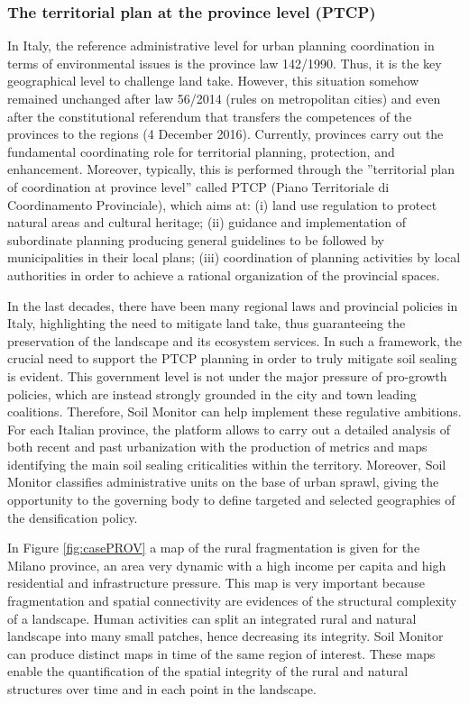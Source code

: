 \documentclass[APA,LATO1COL,doublespace]{WileyNJD-v2}
\begin{document}
\subsubsection{The territorial plan at the province level (PTCP)}
\label{sec:casePROV}
In Italy, the reference administrative level for urban planning coordination in terms of environmental issues is the province law 142/1990. 
Thus, it is the key geographical level to challenge land take. 
However, this situation somehow remained unchanged after law 56/2014 (rules on metropolitan cities) and even after the constitutional referendum that transfers the competences of the provinces to the regions (4 December 2016).
Currently, provinces %
carry out the fundamental coordinating role for territorial planning, protection, and enhancement. 
Moreover, typically, this is performed through the ''territorial plan of coordination at province level'' called PTCP (Piano Territoriale di Coordinamento Provinciale), which aims at: (i) land use regulation to protect natural areas and cultural heritage; (ii) guidance and implementation of subordinate planning producing general guidelines to be followed by municipalities in their local plans; (iii) coordination of planning activities by local authorities in order to achieve a rational organization of the provincial spaces.

In the last decades, there have been many regional laws and provincial policies in Italy, highlighting the need to mitigate land take, thus guaranteeing the preservation of the landscape and its ecosystem services. 
In such a framework, the crucial need to support the PTCP planning in order to truly mitigate soil sealing is evident. 
This government level is not under the major pressure of pro-growth policies, which are instead strongly grounded in the city and town leading coalitions.
Therefore, Soil Monitor can help implement these regulative ambitions.
For each Italian province, the platform allows to carry out a detailed analysis of both recent and past urbanization with the production of metrics and maps identifying the main soil sealing criticalities within the territory.
Moreover, Soil Monitor classifies administrative units on the base of urban sprawl, giving the opportunity to the governing body to define targeted and selected geographies of the densification policy.

In Figure \ref{fig:casePROV} a map of the rural fragmentation is given for the Milano province, an area very dynamic with a high income per capita and high residential and infrastructure pressure. 
This map is very important because fragmentation
and spatial connectivity are evidences of the structural complexity of a landscape.
Human activities can split an integrated rural and natural landscape into many small patches, hence decreasing its integrity.
Soil Monitor can produce distinct maps in time of the same region of interest.
These maps enable the quantification of the spatial integrity of the rural and natural structures over time and in each point in the landscape.
\end{document}
